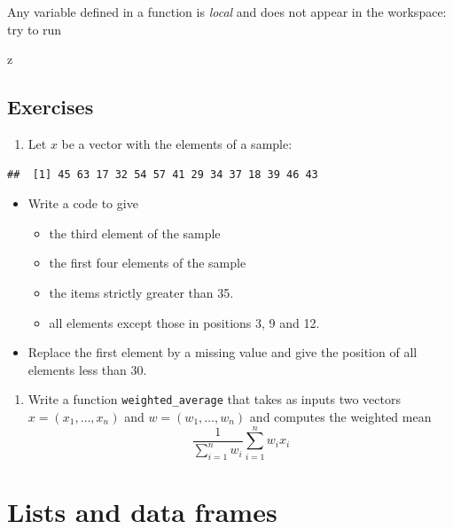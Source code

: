 \documentclass[]{book}
\newenvironment{Shaded}{\begin{snugshade}}{\end{snugshade}}
\newcommand{\NormalTok}[1]{#1}
\providecommand{\tightlist}{%
  \setlength{\itemsep}{0pt}\setlength{\parskip}{0pt}}
\begin{document}
Any variable defined in a function is \emph{local} and does not appear in the workspace: try to run

\begin{Shaded}
\begin{Highlighting}[]
\NormalTok{z}
\end{Highlighting}
\end{Shaded}

\hypertarget{exercises}{%
\section{Exercises}\label{exercises}}

\begin{enumerate}
\def\labelenumi{\arabic{enumi}.}
\tightlist
\item
  Let \(x\) be a vector with the elements of a sample:
\end{enumerate}

\begin{verbatim}
##  [1] 45 63 17 32 54 57 41 29 34 37 18 39 46 43
\end{verbatim}

\begin{itemize}
\tightlist
\item
  Write a code to give

  \begin{itemize}
  \tightlist
  \item
    the third element of the sample
  \item
    the first four elements of the sample
  \item
    the items strictly greater than 35.
  \item
    all elements except those in positions 3, 9 and 12.
  \end{itemize}
\item
  Replace the first element by a missing value and give the position of all elements less than 30.
\end{itemize}

\begin{enumerate}
\def\labelenumi{\arabic{enumi}.}
\setcounter{enumi}{1}
\tightlist
\item
  Write a function \texttt{weighted\_average} that takes as inputs two vectors \(x=(x_1,\ldots,x_n)\) and \(w=(w_1,\ldots,w_n)\) and computes the weighted mean
  \[
  \frac{1}{\sum_{i=1}^n w_i}\sum_{i=1}^nw_ix_i
  \]
\end{enumerate}

\hypertarget{lists-and-data-frames}{%
\chapter{Lists and data frames}\label{lists-and-data-frames}}
\end{document}
